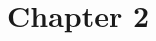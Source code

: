 \documentclass[../main.tex]{subfiles}
\begin{document}
\chapter{Chapter 2}
\label{chapter:2}
\end{document}
